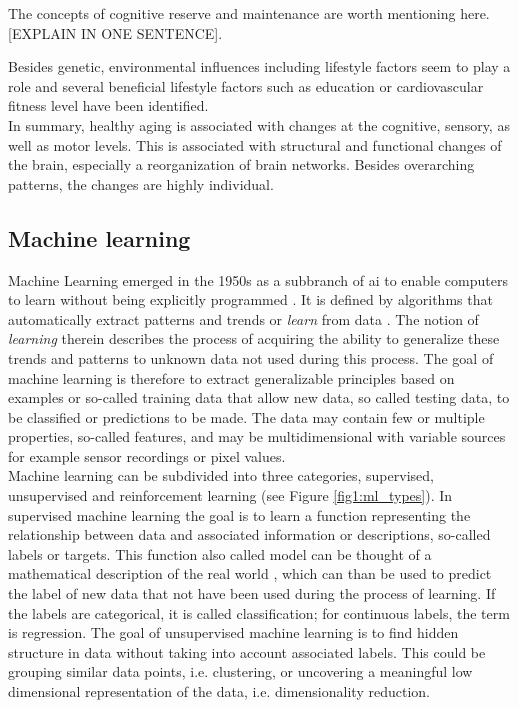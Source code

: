 The concepts of cognitive reserve and maintenance are worth mentioning here. [EXPLAIN IN ONE SENTENCE]. 




Besides genetic, environmental influences including lifestyle factors seem to play a role \cite{Smith2020} and several beneficial lifestyle factors such as education \cite{Chan2021} or cardiovascular fitness level \cite{Douw2014} have been identified.\\
In summary, healthy aging is associated with changes at the cognitive, sensory, as well as motor levels. This is associated with structural and functional changes of the brain, especially a reorganization of brain networks. Besides overarching patterns, the changes are highly individual.

\subsection{Machine learning}
\label{subsec:ML}
Machine Learning emerged in the 1950s as a subbranch of \gls{ai} to enable computers to learn without being explicitly programmed \cite{Samual1959}. It is defined by algorithms that automatically extract patterns and trends or \textit{learn} from data \cite{Hastie2009}. The notion of \textit{learning} therein describes the process of acquiring the ability to generalize these trends and patterns to unknown data not used during this process. The goal of machine learning is therefore to extract generalizable principles based on examples or so-called training data that allow new data, so called testing data, to be classified or predictions to be made. The data may contain few or multiple properties, so-called features, and may be multidimensional with variable sources for example sensor recordings or pixel values.\\ 
Machine learning can be subdivided into three categories, supervised, unsupervised and reinforcement learning (see Figure \ref{fig1:ml_types}). In supervised machine learning the goal is to learn a function representing the relationship between data and associated information or descriptions, so-called labels or targets. This function also called model can be thought of a mathematical description of the real world \cite{Brunton2019}, which can than be used to predict the label of new data that not have been used during the process of learning. If the labels are categorical, it is called classification; for continuous labels, the term is regression. The goal of unsupervised machine learning is to find hidden structure in data without taking into account associated labels. This could be grouping similar data points, i.e. clustering, or uncovering a meaningful low dimensional representation of the data, i.e. dimensionality reduction. 
